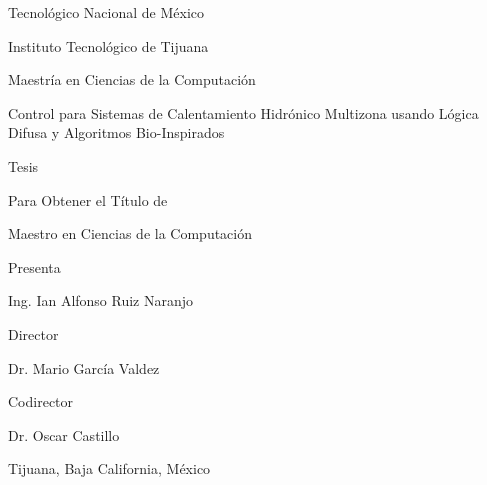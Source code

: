 \pagestyle{empty}
\begin{center}
	\vspace*{3cm}
	\Huge{Tecnológico Nacional de México}
	
	\vspace{0.2cm}
	\huge{Instituto Tecnológico de Tijuana}
	
	\vspace{0.2cm}
	\Large{Maestría en Ciencias de la Computación}
	
	\vspace{2cm}
	\LARGE{Control para Sistemas de Calentamiento Hidrónico Multizona usando Lógica Difusa y Algoritmos Bio-Inspirados}
	
	\vspace{1.5cm}
	\LARGE{Tesis}
	
	\vspace{1cm}
	\footnotesize{Para Obtener el Título de}
	
	\Large{Maestro en Ciencias de la Computación}
	
	\vspace{1cm}
	\footnotesize{Presenta}

	\normalsize{Ing. Ian Alfonso Ruiz Naranjo}
	
	\vspace{1cm}
	\footnotesize{Director}
	
	\normalsize{Dr. Mario García Valdez}
	
	\vspace{0.4cm}
	\footnotesize{Codirector}
	
	\normalsize{Dr. Oscar Castillo}
	
	\vspace{1cm}
	\small{Tijuana, Baja California, México}
\end{center}